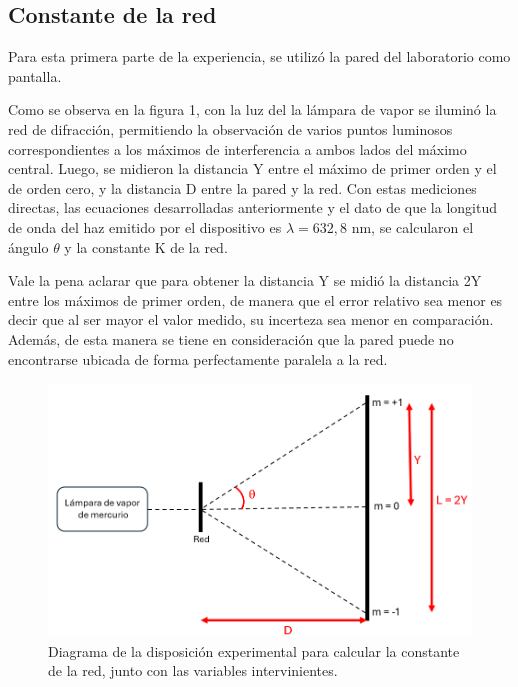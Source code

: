 \documentclass[12pt, a4paper]{article}
\begin{document}
\subsection{Constante de la red}
Para esta primera parte de la experiencia, se utilizó la pared del laboratorio como pantalla. \par Como se observa en la figura 1, con la luz del la lámpara de vapor se iluminó la red de difracción, permitiendo la observación de varios puntos luminosos correspondientes a los máximos de interferencia a ambos lados del máximo central. Luego, se midieron la distancia Y entre el máximo de primer orden y el de orden cero, y la distancia D entre la pared y la red. Con estas mediciones directas, las ecuaciones desarrolladas anteriormente y el dato de que la longitud de onda del haz emitido por el dispositivo es $\lambda = 632,8$ nm, se calcularon el ángulo $\theta$ y la constante K de la red.

Vale la pena aclarar que para obtener la distancia Y se midió la distancia 2Y entre los máximos de primer orden, de manera que el error relativo sea menor es decir que al ser mayor el valor medido, su incerteza sea menor en comparación. Además, de esta manera se tiene en consideración que la pared puede no encontrarse ubicada de forma perfectamente paralela a la red.


\begin{figure}[!h] 
        \centering \includegraphics[width=0.5\columnwidth]{diagramaExperimental1.png}
        \caption{\label{fig1}Diagrama de la disposición experimental para calcular la constante de la red, junto con las variables intervinientes.
        }
\end{figure}
\end{document}
